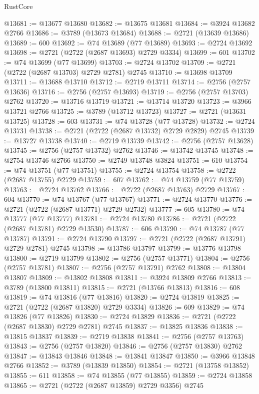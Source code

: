\begin{lexlean}{RustCore}
\begin{coremodule}
@13681 := @13677 @13680
@13682 := @13675 @13681
@13684 := @3924 @13682 @2766
@13686 := @3789 (@13673 @13684)
@13688 := @2721 (@13639 @13686)
@13689 := 600
@13692 := @74 @13689 (@77 @13689)
@13693 := @2724 @13692
@13698 := @2721 (@2722 (@2687 @13693) @2729 @3334)
@13699 := 601
@13702 := @74 @13699 (@77 @13699)
@13703 := @2724 @13702
@13709 := @2721 (@2722 (@2687 @13703) @2729 @2781) @2745
@13710 := @13698 @13709
@13711 := @13688 @13710
@13712 := @2719 @13711
@13714 := @2756 (@2757 @13636)
@13716 := @2756 (@2757 @13693)
@13719 := @2756 (@2757 @13703) @2762
@13720 := @13716 @13719
@13721 := @13714 @13720
@13723 := @3966 @13721 @2766
@13725 := @3789 (@13712 @13723)
@13727 := @2721 (@13631 @13725)
@13728 := 603
@13731 := @74 @13728 (@77 @13728)
@13732 := @2724 @13731
@13738 := @2721 (@2722 (@2687 @13732) @2729 @2829) @2745
@13739 := @13727 @13738
@13740 := @2719 @13739
@13742 := @2756 (@2757 @13628)
@13745 := @2756 (@2757 @13732) @2762
@13746 := @13742 @13745
@13748 := @2754 @13746 @2766
@13750 := @2749 @13748 @3824
@13751 := 610
@13754 := @74 @13751 (@77 @13751)
@13755 := @2724 @13754
@13758 := @2722 (@2687 @13755) @2729
@13759 := 607
@13762 := @74 @13759 (@77 @13759)
@13763 := @2724 @13762
@13766 := @2722 (@2687 @13763) @2729
@13767 := 604
@13770 := @74 @13767 (@77 @13767)
@13771 := @2724 @13770
@13776 := @2721 (@2722 (@2687 @13771) @2729 @2732)
@13777 := 605
@13780 := @74 @13777 (@77 @13777)
@13781 := @2724 @13780
@13786 := @2721 (@2722 (@2687 @13781) @2729 @13530)
@13787 := 606
@13790 := @74 @13787 (@77 @13787)
@13791 := @2724 @13790
@13797 := @2721 (@2722 (@2687 @13791) @2729 @2781) @2745
@13798 := @13786 @13797
@13799 := @13776 @13798
@13800 := @2719 @13799
@13802 := @2756 (@2757 @13771)
@13804 := @2756 (@2757 @13781)
@13807 := @2756 (@2757 @13791) @2762
@13808 := @13804 @13807
@13809 := @13802 @13808
@13811 := @3924 @13809 @2766
@13813 := @3789 (@13800 @13811)
@13815 := @2721 (@13766 @13813)
@13816 := 608
@13819 := @74 @13816 (@77 @13816)
@13820 := @2724 @13819
@13825 := @2721 (@2722 (@2687 @13820) @2729 @3334)
@13826 := 609
@13829 := @74 @13826 (@77 @13826)
@13830 := @2724 @13829
@13836 := @2721 (@2722 (@2687 @13830) @2729 @2781) @2745
@13837 := @13825 @13836
@13838 := @13815 @13837
@13839 := @2719 @13838
@13841 := @2756 (@2757 @13763)
@13843 := @2756 (@2757 @13820)
@13846 := @2756 (@2757 @13830) @2762
@13847 := @13843 @13846
@13848 := @13841 @13847
@13850 := @3966 @13848 @2766
@13852 := @3789 (@13839 @13850)
@13854 := @2721 (@13758 @13852)
@13855 := 611
@13858 := @74 @13855 (@77 @13855)
@13859 := @2724 @13858
@13865 := @2721 (@2722 (@2687 @13859) @2729 @3356) @2745

\end{coremodule}
\end{lexlean}
